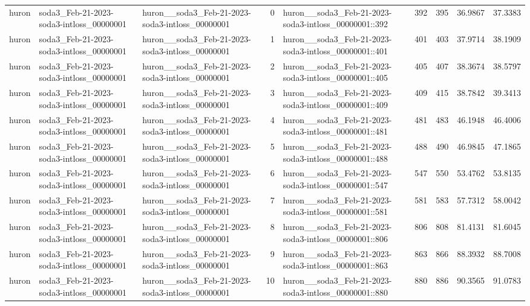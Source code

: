 \begin{longtable}{lllrlllrr}
huron & soda3\_Feb-21-2023-soda3-intloss\_00000001 & huron\_\_soda3\_Feb-21-2023-soda3-intloss\_00000001 & 0 & huron\_\_soda3\_Feb-21-2023-soda3-intloss\_00000001::392 & 392 & 395 & 36.9867 & 37.3383 \\
huron & soda3\_Feb-21-2023-soda3-intloss\_00000001 & huron\_\_soda3\_Feb-21-2023-soda3-intloss\_00000001 & 1 & huron\_\_soda3\_Feb-21-2023-soda3-intloss\_00000001::401 & 401 & 403 & 37.9714 & 38.1909 \\
huron & soda3\_Feb-21-2023-soda3-intloss\_00000001 & huron\_\_soda3\_Feb-21-2023-soda3-intloss\_00000001 & 2 & huron\_\_soda3\_Feb-21-2023-soda3-intloss\_00000001::405 & 405 & 407 & 38.3674 & 38.5797 \\
huron & soda3\_Feb-21-2023-soda3-intloss\_00000001 & huron\_\_soda3\_Feb-21-2023-soda3-intloss\_00000001 & 3 & huron\_\_soda3\_Feb-21-2023-soda3-intloss\_00000001::409 & 409 & 415 & 38.7842 & 39.3413 \\
huron & soda3\_Feb-21-2023-soda3-intloss\_00000001 & huron\_\_soda3\_Feb-21-2023-soda3-intloss\_00000001 & 4 & huron\_\_soda3\_Feb-21-2023-soda3-intloss\_00000001::481 & 481 & 483 & 46.1948 & 46.4006 \\
huron & soda3\_Feb-21-2023-soda3-intloss\_00000001 & huron\_\_soda3\_Feb-21-2023-soda3-intloss\_00000001 & 5 & huron\_\_soda3\_Feb-21-2023-soda3-intloss\_00000001::488 & 488 & 490 & 46.9845 & 47.1865 \\
huron & soda3\_Feb-21-2023-soda3-intloss\_00000001 & huron\_\_soda3\_Feb-21-2023-soda3-intloss\_00000001 & 6 & huron\_\_soda3\_Feb-21-2023-soda3-intloss\_00000001::547 & 547 & 550 & 53.4762 & 53.8135 \\
huron & soda3\_Feb-21-2023-soda3-intloss\_00000001 & huron\_\_soda3\_Feb-21-2023-soda3-intloss\_00000001 & 7 & huron\_\_soda3\_Feb-21-2023-soda3-intloss\_00000001::581 & 581 & 583 & 57.7312 & 58.0042 \\
huron & soda3\_Feb-21-2023-soda3-intloss\_00000001 & huron\_\_soda3\_Feb-21-2023-soda3-intloss\_00000001 & 8 & huron\_\_soda3\_Feb-21-2023-soda3-intloss\_00000001::806 & 806 & 808 & 81.4131 & 81.6045 \\
huron & soda3\_Feb-21-2023-soda3-intloss\_00000001 & huron\_\_soda3\_Feb-21-2023-soda3-intloss\_00000001 & 9 & huron\_\_soda3\_Feb-21-2023-soda3-intloss\_00000001::863 & 863 & 866 & 88.3932 & 88.7008 \\
huron & soda3\_Feb-21-2023-soda3-intloss\_00000001 & huron\_\_soda3\_Feb-21-2023-soda3-intloss\_00000001 & 10 & huron\_\_soda3\_Feb-21-2023-soda3-intloss\_00000001::880 & 880 & 886 & 90.3565 & 91.0783 \\

\end{longtable}

